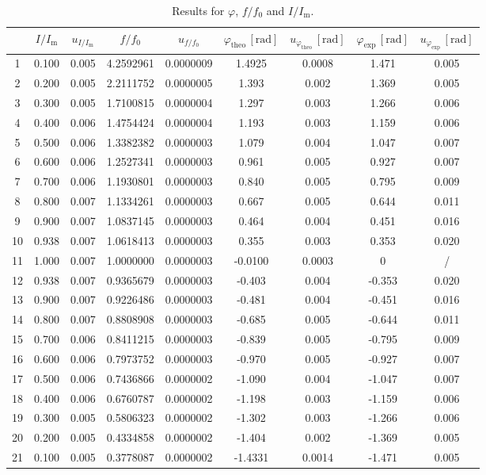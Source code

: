 \documentclass{article}
\begin{document}
\begin{table}[H]\centering
    \begin{tabular}{c|cc|cc|cc|cc}
        \toprule
           &   $I/I_\text{m}$ & $u_{I/I_\text{m}}$ &    $f/f_0$ & $u_{f/f_0}$ & $\varphi_\text{theo}\,[\text{rad}]$ & $u_{\varphi_\text{theo}}\,[\text{rad}]$ & $\varphi_\text{exp}\,[\text{rad}]$ & $u_{\varphi_\text{exp}}\,[\text{rad}]$\\
        \midrule
1 & 0.100 & 0.005 & 4.2592961 & 0.0000009 & 1.4925 & 0.0008 & 1.471 & 0.005 \\
2 & 0.200 & 0.005 & 2.2111752 & 0.0000005 & 1.393 & 0.002 & 1.369 & 0.005 \\
3 & 0.300 & 0.005 & 1.7100815 & 0.0000004 & 1.297 & 0.003 & 1.266 & 0.006 \\
4 & 0.400 & 0.006 & 1.4754424 & 0.0000004 & 1.193 & 0.003 & 1.159 & 0.006 \\
5 & 0.500 & 0.006 & 1.3382382 & 0.0000003 & 1.079 & 0.004 & 1.047 & 0.007 \\
6 & 0.600 & 0.006 & 1.2527341 & 0.0000003 & 0.961 & 0.005 & 0.927 & 0.007 \\
7 & 0.700 & 0.006 & 1.1930801 & 0.0000003 & 0.840 & 0.005 & 0.795 & 0.009 \\
8 & 0.800 & 0.007 & 1.1334261 & 0.0000003 & 0.667 & 0.005 & 0.644 & 0.011 \\
9 & 0.900 & 0.007 & 1.0837145 & 0.0000003 & 0.464 & 0.004 & 0.451 & 0.016 \\
10 & 0.938 & 0.007 & 1.0618413 & 0.0000003 & 0.355 & 0.003 & 0.353 & 0.020 \\
11 & 1.000 & 0.007 & 1.0000000 & 0.0000003 & -0.0100 & 0.0003 & 0 & / \\
12 & 0.938 & 0.007 & 0.9365679 & 0.0000003 & -0.403 & 0.004 & -0.353 & 0.020 \\
13 & 0.900 & 0.007 & 0.9226486 & 0.0000003 & -0.481 & 0.004 & -0.451 & 0.016 \\
14 & 0.800 & 0.007 & 0.8808908 & 0.0000003 & -0.685 & 0.005 & -0.644 & 0.011 \\
15 & 0.700 & 0.006 & 0.8411215 & 0.0000003 & -0.839 & 0.005 & -0.795 & 0.009 \\
16 & 0.600 & 0.006 & 0.7973752 & 0.0000003 & -0.970 & 0.005 & -0.927 & 0.007 \\
17 & 0.500 & 0.006 & 0.7436866 & 0.0000002 & -1.090 & 0.004 & -1.047 & 0.007 \\
18 & 0.400 & 0.006 & 0.6760787 & 0.0000002 & -1.198 & 0.003 & -1.159 & 0.006 \\
19 & 0.300 & 0.005 & 0.5806323 & 0.0000002 & -1.302 & 0.003 & -1.266 & 0.006 \\
20 & 0.200 & 0.005 & 0.4334858 & 0.0000002 & -1.404 & 0.002 & -1.369 & 0.005 \\
21 & 0.100 & 0.005 & 0.3778087 & 0.0000002 & -1.4331 & 0.0014 & -1.471 & 0.005 \\
        \bottomrule
    \end{tabular}
    \caption{Results for $\varphi$, $f/f_0$ and $I/I_\text{m}$.}\label{TablePhi}
\end{table}
\end{document}
